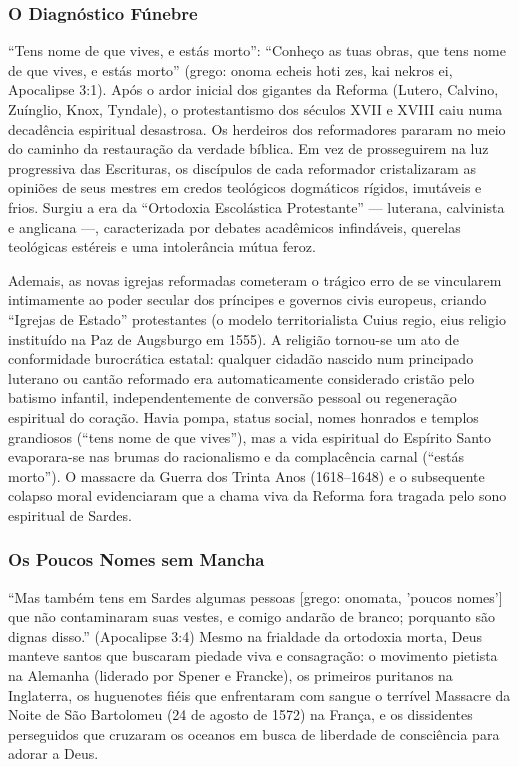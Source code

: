 \documentclass[11pt,a4paper,openany]{book}
\begin{document}
\subsubsection*{O Diagnóstico Fúnebre}
``Tens nome de que vives, e estás morto'':
``Conheço as tuas obras, que tens nome de que vives, e estás morto'' (grego: onoma echeis hoti zes, kai nekros ei, Apocalipse 3:1).
Após o ardor inicial dos gigantes da Reforma (Lutero, Calvino, Zuínglio, Knox, Tyndale), o protestantismo dos séculos XVII e XVIII caiu numa decadência espiritual desastrosa. Os herdeiros dos reformadores pararam no meio do caminho da restauração da verdade bíblica. Em vez de prosseguirem na luz progressiva das Escrituras, os discípulos de cada reformador cristalizaram as opiniões de seus mestres em credos teológicos dogmáticos rígidos, imutáveis e frios. Surgiu a era da ``Ortodoxia Escolástica Protestante'' — luterana, calvinista e anglicana —, caracterizada por debates acadêmicos infindáveis, querelas teológicas estéreis e uma intolerância mútua feroz.

Ademais, as novas igrejas reformadas cometeram o trágico erro de se vincularem intimamente ao poder secular dos príncipes e governos civis europeus, criando ``Igrejas de Estado'' protestantes (o modelo territorialista Cuius regio, eius religio instituído na Paz de Augsburgo em 1555). A religião tornou-se um ato de conformidade burocrática estatal: qualquer cidadão nascido num principado luterano ou cantão reformado era automaticamente considerado cristão pelo batismo infantil, independentemente de conversão pessoal ou regeneração espiritual do coração. Havia pompa, status social, nomes honrados e templos grandiosos (``tens nome de que vives''), mas a vida espiritual do Espírito Santo evaporara-se nas brumas do racionalismo e da complacência carnal (``estás morto''). O massacre da Guerra dos Trinta Anos (1618–1648) e o subsequente colapso moral evidenciaram que a chama viva da Reforma fora tragada pelo sono espiritual de Sardes.


\subsubsection*{Os Poucos Nomes sem Mancha}
``Mas também tens em Sardes algumas pessoas [grego: onomata, 'poucos nomes'] que não contaminaram suas vestes, e comigo andarão de branco; porquanto são dignas disso.'' (Apocalipse 3:4)
Mesmo na frialdade da ortodoxia morta, Deus manteve santos que buscaram piedade viva e consagração: o movimento pietista na Alemanha (liderado por Spener e Francke), os primeiros puritanos na Inglaterra, os huguenotes fiéis que enfrentaram com sangue o terrível Massacre da Noite de São Bartolomeu (24 de agosto de 1572) na França, e os dissidentes perseguidos que cruzaram os oceanos em busca de liberdade de consciência para adorar a Deus.
\end{document}
